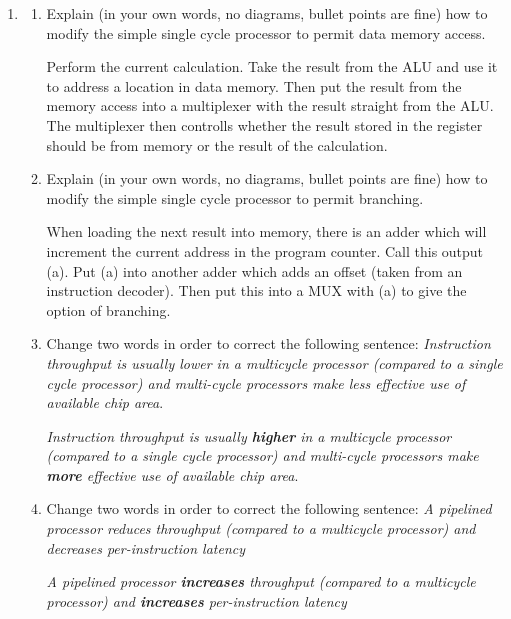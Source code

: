 \documentclass[10pt,\jkfside,a4paper]{article}
\begin{document}
\begin{enumerate}
\begin{center}
\end{center}

\item

\begin{enumerate}

\item{Explain (in your own words, no diagrams, bullet points are fine) how 
to modify the simple single cycle processor to permit data memory access.}

Perform the current calculation. Take the result from the ALU and use it to 
address a location in data memory. Then put the result from the memory access 
into a multiplexer with the result straight from the ALU.
The multiplexer then controlls whether the result stored in the register should 
be from memory or the result of the calculation.

\item{Explain (in your own words, no diagrams, bullet points are fine) how 
to modify the simple single cycle processor to permit branching.}

When loading the next result into memory, there is an adder which will increment 
the current address in the program counter. Call this output (a). Put (a) into 
another adder which adds an offset (taken from an instruction decoder). Then 
put this into a MUX with (a) to give the option of branching.

\item{Change two words in order to correct the following sentence: 
\textit{Instruction throughput is usually lower in a multicycle processor 
(compared  to a single cycle processor) and multi-cycle processors make less 
effective use of available chip area}.}

\textit{Instruction throughput is usually \textbf{higher} in a multicycle processor 
(compared  to a single cycle processor) and multi-cycle processors make \textbf{more}
effective use of available chip area}.

\item{Change two words in order to correct the following sentence: \textit{A 
pipelined processor reduces throughput (compared to a multicycle processor) 
and decreases per-instruction latency}}

\textit{A pipelined processor \textbf{increases} throughput (compared to a 
multicycle processor) and \textbf{increases} per-instruction latency}

\end{enumerate}


\end{enumerate}
\end{document}
